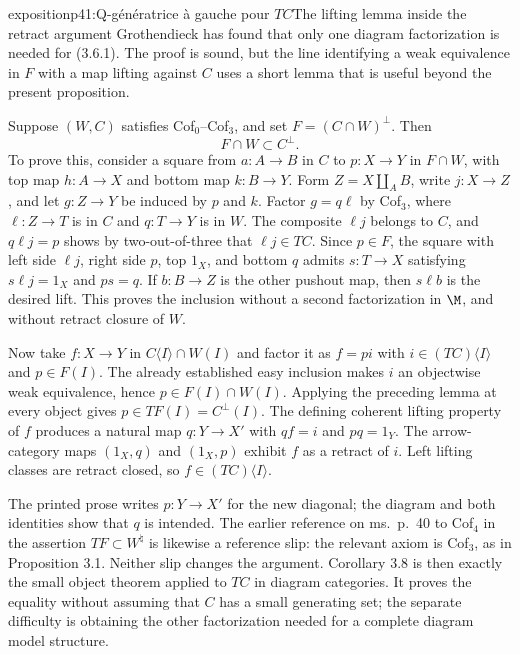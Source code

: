 \begin{dcomment}{exposition}{p41:Q-génératrice à gauche pour $TC$}{The lifting lemma inside the retract argument}
Grothendieck has found that only one diagram factorization is needed for (3.6.1). The proof is sound, but the line identifying a weak equivalence in $F$ with a map lifting against $C$ uses a short lemma that is useful beyond the present proposition.

Suppose $(W,C)$ satisfies Cof$_0$--Cof$_3$, and set $F=(C\cap W)^\perp$. Then
\[
 F\cap W\subset C^\perp.
\]
To prove this, consider a square from $a:A\to B$ in $C$ to $p:X\to Y$ in $F\cap W$, with top map $h:A\to X$ and bottom map $k:B\to Y$. Form $Z=X\amalg_A B$, write $j:X\to Z$, and let $g:Z\to Y$ be induced by $p$ and $k$. Factor $g=q\ell$ by Cof$_3$, where $\ell:Z\to T$ is in $C$ and $q:T\to Y$ is in $W$. The composite $\ell j$ belongs to $C$, and $q\ell j=p$ shows by two-out-of-three that $\ell j\in TC$. Since $p\in F$, the square with left side $\ell j$, right side $p$, top $1_X$, and bottom $q$ admits $s:T\to X$ satisfying $s\ell j=1_X$ and $ps=q$. If $b:B\to Z$ is the other pushout map, then $s\ell b$ is the desired lift. This proves the inclusion without a second factorization in $\M$, and without retract closure of $W$.

Now take $f:X\to Y$ in $C\langle I\rangle\cap W(I)$ and factor it as $f=pi$ with $i\in(TC)\langle I\rangle$ and $p\in F(I)$. The already established easy inclusion makes $i$ an objectwise weak equivalence, hence $p\in F(I)\cap W(I)$. Applying the preceding lemma at every object gives $p\in TF(I)=C^\perp(I)$. The defining coherent lifting property of $f$ produces a natural map $q:Y\to X'$ with $qf=i$ and $pq=1_Y$. The arrow-category maps $(1_X,q)$ and $(1_X,p)$ exhibit $f$ as a retract of $i$. Left lifting classes are retract closed, so $f\in(TC)\langle I\rangle$.

The printed prose writes $p:Y\to X'$ for the new diagonal; the diagram and both identities show that $q$ is intended. The earlier reference on ms.~p.~40 to Cof$_4$ in the assertion $TF\subset W^{\natural}$ is likewise a reference slip: the relevant axiom is Cof$_3$, as in Proposition 3.1. Neither slip changes the argument. Corollary 3.8 is then exactly the small object theorem applied to $TC$ in diagram categories. It proves the equality without assuming that $C$ has a small generating set; the separate difficulty is obtaining the other factorization needed for a complete diagram model structure.
\end{dcomment}

